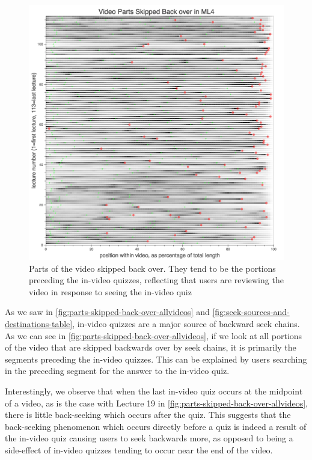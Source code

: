 \documentclass{sigchi}
\begin{document}
\begin{figure}
\includegraphics[width=1.0\columnwidth]{parts-skipped-back-over-allvideos}
\caption{Parts of the video skipped back over. They tend to be the portions preceding the in-video quizzes, reflecting that users are reviewing the video in response to seeing the in-video quiz}
\label{fig:parts-skipped-back-over-allvideos}
\end{figure}

As we saw in \autoref{fig:parts-skipped-back-over-allvideos} and \autoref{fig:seek-sources-and-destinations-table}, in-video quizzes are a major source of backward seek chains. As we can see in \autoref{fig:parts-skipped-back-over-allvideos}, if we look at all portions of the video that are skipped backwards over by seek chains, it is primarily the segments preceding the in-video quizzes. This can be explained by users searching in the preceding segment for the answer to the in-video quiz. %

Interestingly, we observe that when the last in-video quiz occurs at the midpoint of a video, as is the case with Lecture 19 in \autoref{fig:parts-skipped-back-over-allvideos}, there is little back-seeking which occurs after the quiz. This suggests that the back-seeking phenomenon which occurs directly before a quiz is indeed a result of the in-video quiz causing users to seek backwards more, as opposed to being a side-effect of in-video quizzes tending to occur near the end of the video.
\end{document}
